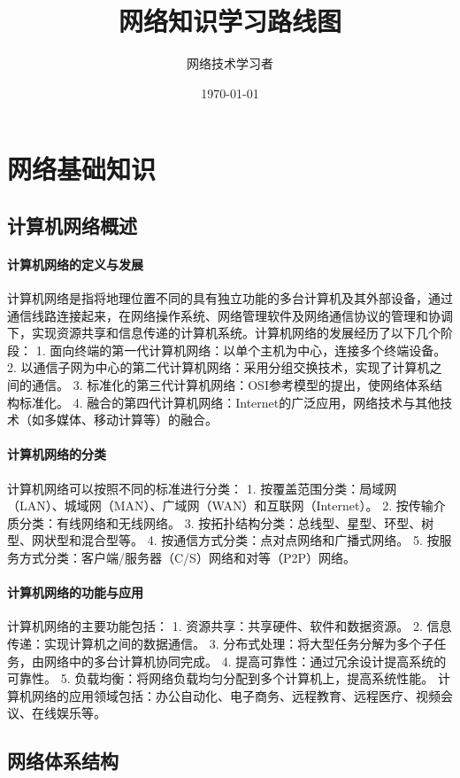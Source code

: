 \documentclass{book}
\title{网络知识学习路线图}
\author{网络技术学习者}
\date{\today}
\begin{document}
\frontmatter

\maketitle

\tableofcontents

\mainmatter

\chapter{网络基础知识}
\section{计算机网络概述}
\subsubsection{计算机网络的定义与发展}
计算机网络是指将地理位置不同的具有独立功能的多台计算机及其外部设备，通过通信线路连接起来，在网络操作系统、网络管理软件及网络通信协议的管理和协调下，实现资源共享和信息传递的计算机系统。计算机网络的发展经历了以下几个阶段：
1. 面向终端的第一代计算机网络：以单个主机为中心，连接多个终端设备。
2. 以通信子网为中心的第二代计算机网络：采用分组交换技术，实现了计算机之间的通信。
3. 标准化的第三代计算机网络：OSI参考模型的提出，使网络体系结构标准化。
4. 融合的第四代计算机网络：Internet的广泛应用，网络技术与其他技术（如多媒体、移动计算等）的融合。
\subsubsection{计算机网络的分类}
计算机网络可以按照不同的标准进行分类：
1. 按覆盖范围分类：局域网（LAN）、城域网（MAN）、广域网（WAN）和互联网（Internet）。
2. 按传输介质分类：有线网络和无线网络。
3. 按拓扑结构分类：总线型、星型、环型、树型、网状型和混合型等。
4. 按通信方式分类：点对点网络和广播式网络。
5. 按服务方式分类：客户端/服务器（C/S）网络和对等（P2P）网络。
\subsubsection{计算机网络的功能与应用}
计算机网络的主要功能包括：
1. 资源共享：共享硬件、软件和数据资源。
2. 信息传递：实现计算机之间的数据通信。
3. 分布式处理：将大型任务分解为多个子任务，由网络中的多台计算机协同完成。
4. 提高可靠性：通过冗余设计提高系统的可靠性。
5. 负载均衡：将网络负载均匀分配到多个计算机上，提高系统性能。
计算机网络的应用领域包括：办公自动化、电子商务、远程教育、远程医疗、视频会议、在线娱乐等。
\section{网络体系结构}
\end{document}
